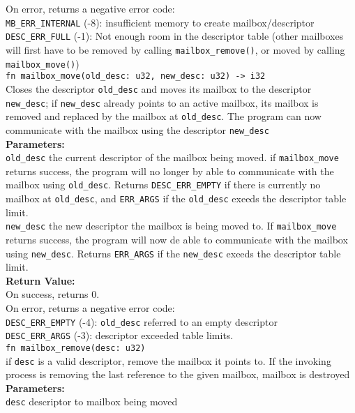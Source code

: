 \documentclass{article}
\begin{document}
On error, returns a negative error code:\\

\verb|MB_ERR_INTERNAL| (-8): insufficient memory to create mailbox/descriptor\\
\verb|DESC_ERR_FULL| (-1): Not enough room in the descriptor table (other mailboxes will first have to be removed by calling \verb|mailbox_remove()|, or moved by calling \verb|mailbox_move()|)\\

\verb|fn mailbox_move(old_desc: u32, new_desc: u32) -> i32| \\
Closes the descriptor \verb|old_desc| and moves its mailbox to the descriptor \verb|new_desc|; if \verb|new_desc| already points to an active mailbox, its mailbox is removed and replaced by the mailbox at \verb|old_desc|.  The program can now communicate with the mailbox using the descriptor \verb|new_desc|\\

\textbf{Parameters:}\\
\verb|old_desc| the current descriptor of the mailbox being moved.  if \verb|mailbox_move| returns success, the program will no longer by able to communicate with the mailbox using \verb|old_desc|.  Returns \verb|DESC_ERR_EMPTY| if there is currently no mailbox at \verb|old_desc|, and \verb|ERR_ARGS| if the \verb|old_desc| exeeds the descriptor table limit.\\

\verb|new_desc| the new descriptor the mailbox is being moved to.  If \verb|mailbox_move| returns success, the program will now de able to communicate with the mailbox using \verb|new_desc|.  Returns \verb|ERR_ARGS| if the \verb|new_desc| exeeds the descriptor table limit.\\

\textbf{Return Value:}\\
On success, returns 0.\\

On error, returns a negative error code:\\
\verb|DESC_ERR_EMPTY| (-4): \verb|old_desc| referred to an empty descriptor\\
\verb|DESC_ERR_ARGS| (-3): descriptor exceeded table limits.\\

\verb|fn mailbox_remove(desc: u32)| \\
if \verb|desc| is a valid descriptor, remove the mailbox it points to.  If the invoking process is removing the last reference to the given mailbox, mailbox is destroyed \\

\textbf{Parameters:}\\
\verb|desc| descriptor to mailbox being moved
\end{document}
